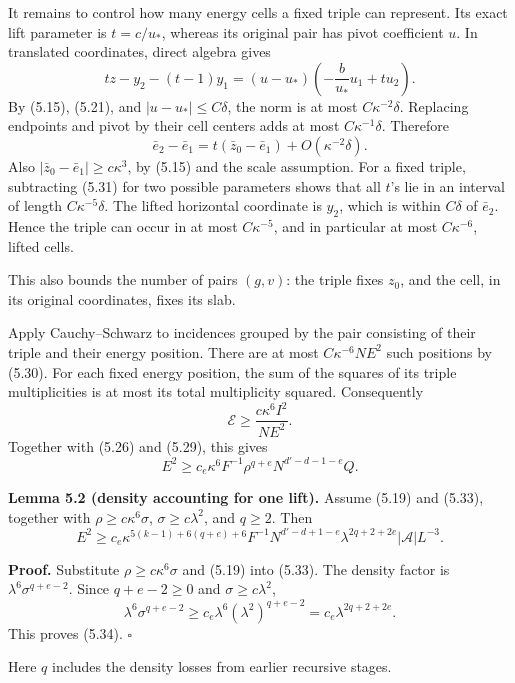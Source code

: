 \documentclass[
  11pt,
  a4paper,
]{article}
\begin{document}
It remains to control how many energy cells a fixed triple can
represent. Its exact lift parameter is \(t=c/u_*\), whereas its original
pair has pivot coefficient \(u\). In translated coordinates, direct
algebra gives \[
 tz-y_2-(t-1)y_1
 =(u-u_*)\left(-\frac{b}{u_*}u_1+t u_2\right).
\] By (5.15), (5.21), and \(|u-u_*|\le C\delta\), the norm is at most
\(C\kappa^{-2}\delta\). Replacing endpoints and pivot by their cell
centers adds at most \(C\kappa^{-1}\delta\). Therefore \[
 \bar e_2-\bar e_1
 =t(\bar z_0-\bar e_1)+O(\kappa^{-2}\delta).        \tag{5.31}\label{eq:5.31}
\] Also \(|\bar z_0-\bar e_1|\ge c\kappa^3\), by (5.15) and the scale
assumption. For a fixed triple, subtracting (5.31) for two possible
parameters shows that all \(t\)'s lie in an interval of length
\(C\kappa^{-5}\delta\). The lifted horizontal coordinate is \(y_2\),
which is within \(C\delta\) of \(\bar e_2\). Hence the triple can occur
in at most \(C\kappa^{-5}\), and in particular at most \(C\kappa^{-6}\),
lifted cells.

This also bounds the number of pairs \((g,v)\): the triple fixes
\(z_0\), and the cell, in its original coordinates, fixes its slab.

Apply Cauchy--Schwarz to incidences grouped by the pair consisting of
their triple and their energy position. There are at most
\(C\kappa^{-6}NE^2\) such positions by (5.30). For each fixed energy
position, the sum of the squares of its triple multiplicities is at most
its total multiplicity squared. Consequently \[
 \mathcal E\ge \frac{c\kappa^6 I^2}{NE^2}.         \tag{5.32}\label{eq:5.32}
\] Together with (5.26) and (5.29), this gives \[
 E^2\ge c_e\kappa^6F^{-1}\rho^{q+e}
                         N^{d'-d-1-e}Q.           \tag{5.33}\label{eq:5.33}
\]

\textbf{Lemma 5.2 (density accounting for one lift).} Assume (5.19) and
(5.33), together with \(\rho\ge c\kappa^6\sigma\),
\(\sigma\ge c\lambda^2\), and \(q\ge2\). Then \[
 E^2\ge c_e\kappa^{5(k-1)+6(q+e)+6}
 F^{-1}N^{d'-d+1-e}\lambda^{2q+2+2e}
                         |\mathcal A|L^{-3}.      \tag{5.34}\label{eq:5.34}
\]

\textbf{Proof.} Substitute \(\rho\ge c\kappa^6\sigma\) and (5.19) into
(5.33). The density factor is \(\lambda^6\sigma^{q+e-2}\). Since
\(q+e-2\ge0\) and \(\sigma\ge c\lambda^2\), \[
 \lambda^6\sigma^{q+e-2}
 \ge c_e\lambda^6(\lambda^2)^{q+e-2}
 =c_e\lambda^{2q+2+2e}.
\] This proves (5.34). \(\square\)

Here \(q\) includes the density losses from earlier recursive stages.
\end{document}
